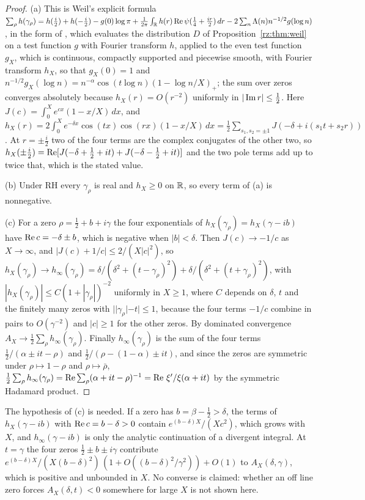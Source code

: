 \begin{proof}
(a) This is Weil's explicit formula $\sum_\rho h(\gamma_\rho)=h(\tfrac i2)+h(-\tfrac i2)-g(0)\log\pi+\frac1{2\pi}\int_{\mathbb{R}} h(r)\operatorname{Re}\psi(\tfrac14+\tfrac{ir}2)\,dr-2\sum_n\Lambda(n)n^{-1/2}g(\log n)$, in the form of \cite{IwaniecKowalski04}, which evaluates the distribution $D$ of Proposition~\ref{rz:thm:weil} on a test function $g$ with Fourier transform $h$, applied to the even test function $g_X$, which is continuous, compactly supported and piecewise smooth, with Fourier transform $h_X$, so that $g_X(0)=1$ and $n^{-1/2}g_X(\log n)=n^{-\alpha}\cos(t\log n)(1-\log n/X)_+$; the sum over zeros converges absolutely because $h_X(r)=O(r^{-2})$ uniformly in $|\operatorname{Im} r|\leq\tfrac12$. Here $J(c)=\int_0^Xe^{cx}(1-x/X)\,dx$, and $h_X(r)=2\int_0^Xe^{-\delta x}\cos(tx)\cos(rx)(1-x/X)\,dx=\tfrac12\sum_{s_1,s_2=\pm1}J(-\delta+i(s_1t+s_2r))$. At $r=\pm\tfrac i2$ two of the four terms are the complex conjugates of the other two, so $h_X(\pm\tfrac i2)=\operatorname{Re}[J(-\delta+\tfrac12+it)+J(-\delta-\tfrac12+it)]$ and the two pole terms add up to twice that, which is the stated value.

(b) Under RH every $\gamma_\rho$ is real and $h_X\geq0$ on $\mathbb{R}$, so every term of (a) is nonnegative.

(c) For a zero $\rho=\tfrac12+b+i\gamma$ the four exponentials of $h_X(\gamma_\rho)=h_X(\gamma-ib)$ have $\operatorname{Re} c=-\delta\pm b$, which is negative when $|b|<\delta$. Then $J(c)\to-1/c$ as $X\to\infty$, and $|J(c)+1/c|\leq2/(X|c|^2)$, so $h_X(\gamma_\rho)\to h_\infty(\gamma_\rho)=\delta/(\delta^2+(t-\gamma_\rho)^2)+\delta/(\delta^2+(t+\gamma_\rho)^2)$, with $|h_X(\gamma_\rho)|\leq C(1+|\gamma_\rho|)^{-2}$ uniformly in $X\geq1$, where $C$ depends on $\delta$, $t$ and the finitely many zeros with $||\gamma_\rho|-t|\leq1$, because the four terms $-1/c$ combine in pairs to $O(\gamma^{-2})$ and $|c|\geq1$ for the other zeros. By dominated convergence $A_X\to\frac12\sum_\rho h_\infty(\gamma_\rho)$. Finally $h_\infty(\gamma_\rho)$ is the sum of the four terms $\frac12/(\alpha\pm it-\rho)$ and $\frac12/(\rho-(1-\alpha)\pm it)$, and since the zeros are symmetric under $\rho\mapsto1-\rho$ and $\rho\mapsto\bar\rho$, $\frac12\sum_\rho h_\infty(\gamma_\rho)=\operatorname{Re}\sum_\rho(\alpha+it-\rho)^{-1}=\operatorname{Re}\,\xi'/\xi(\alpha+it)$ by the symmetric Hadamard product.
\end{proof}

\begin{remark}\label{mw:rem:Xhypothesis}
The hypothesis of (c) is needed. If a zero has $b=\beta-\tfrac12>\delta$, the terms of $h_X(\gamma-ib)$ with $\operatorname{Re} c=b-\delta>0$ contain $e^{(b-\delta)X}/(Xc^2)$, which grows with $X$, and $h_\infty(\gamma-ib)$ is only the analytic continuation of a divergent integral. At $t=\gamma$ the four zeros $\tfrac12\pm b\pm i\gamma$ contribute $e^{(b-\delta)X}/(X(b-\delta)^2)\,(1+O((b-\delta)^2/\gamma^2))+O(1)$ to $A_X(\delta,\gamma)$, which is positive and unbounded in $X$. No converse is claimed: whether an off line zero forces $A_X(\delta,t)<0$ somewhere for large $X$ is not shown here.
\end{remark}

